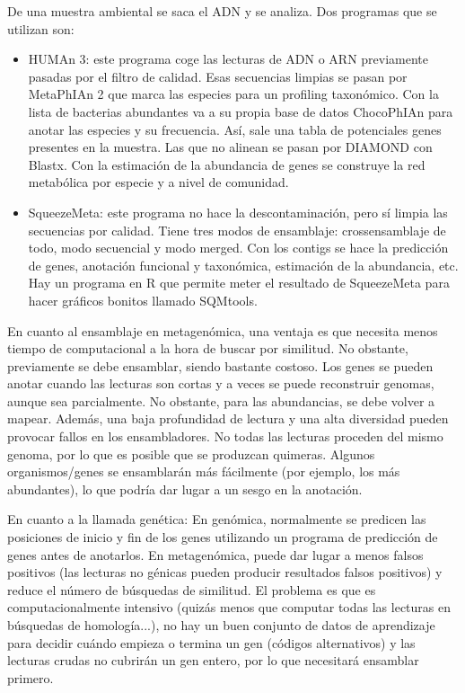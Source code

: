 De una muestra ambiental se saca el ADN y se analiza. Dos programas que se utilizan son:
\begin{itemize}
\item HUMAn 3: este programa coge las lecturas de ADN o ARN previamente pasadas por el filtro de calidad. Esas secuencias limpias se pasan por MetaPhIAn 2 que marca las especies para un profiling taxonómico. Con la lista de bacterias abundantes va a su propia base de datos ChocoPhIAn para anotar las especies y su frecuencia. Así, sale una tabla de potenciales genes presentes en la muestra. Las que no alinean se pasan por DIAMOND con Blastx. Con la estimación de la abundancia de genes se construye la red metabólica por especie y a nivel de comunidad.
\item SqueezeMeta: este programa no hace la descontaminación, pero sí limpia las secuencias por calidad. Tiene tres modos de ensamblaje: crossensamblaje de todo, modo secuencial y modo merged. Con los contigs se hace la predicción de genes, anotación funcional y taxonómica, estimación de la abundancia, etc. Hay un programa en R que permite meter el resultado de SqueezeMeta para hacer gráficos bonitos llamado SQMtools. 
\end{itemize}

En cuanto al ensamblaje en metagenómica, una ventaja es que necesita menos tiempo de computacional a la hora de buscar por similitud. No obstante, previamente se debe ensamblar, siendo bastante costoso. Los genes se pueden anotar cuando las lecturas son cortas y a veces se puede reconstruir genomas, aunque sea parcialmente. No obstante, para las abundancias, se debe volver a mapear. Además, una baja profundidad de lectura y una alta diversidad pueden provocar fallos en los ensambladores. No todas las lecturas proceden del mismo genoma, por lo que es posible que se produzcan quimeras. Algunos organismos/genes se ensamblarán más fácilmente (por ejemplo, los más abundantes), lo que podría dar lugar a un sesgo en la anotación.

En cuanto a la llamada genética:
En genómica, normalmente se predicen las posiciones de inicio y fin de los genes utilizando un programa de predicción de genes antes de anotarlos.
En metagenómica, puede dar lugar a menos falsos positivos (las lecturas no génicas pueden producir resultados falsos positivos) y reduce el número de búsquedas de similitud. El problema es que es computacionalmente intensivo (quizás menos que computar todas las lecturas en búsquedas de homología...), no hay un buen conjunto de datos de aprendizaje para decidir cuándo empieza o termina un gen (códigos alternativos) y las lecturas crudas no cubrirán un gen entero, por lo que necesitará ensamblar primero. 

